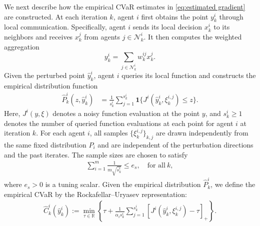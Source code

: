 \documentclass[twocolumn]{autart}    %
\newcommand{\1}{\mathbf{1}}
\begin{document}
We next describe how the empirical CVaR estimates in \eqref{eq:estimated gradient} are constructed. 
At each iteration $k$, agent $i$ first obtains the point $y_k^i$ through local
communication. Specifically, agent $i$ sends its local decision
$x_k^i$ to its neighbors and receives $x_k^j$ from agents
$j\in\mathcal{N}_k^i$. It then computes the weighted aggregation
\begin{equation}\label{eq:update y}
    y_k^i
    =
    \sum_{j\in\mathcal{N}_k^i} w_k^{ij}x_k^j .
\end{equation}
Given the perturbed point $\hat y_k^i$, agent $i$ queries its local function and constructs the empirical distribution function
\begin{align}\label{eq:EDF}
 \hat{P}_k^{i}(z,\hat{y}_k^i)&=\frac{1}{s_k^i} \sum_{j=1}^{s_k^i} \mathbf{1} \{J^i(\hat{y}_k^i, \xi_k^{i,j}) \leq z \}.
\end{align} 
Here, $J^i(y,\xi)$ denotes a noisy function evaluation at
the point $y$, and $s_k^i\geq 1$ denotes the number of queried
function evaluations at each point for agent $i$ at iteration $k$. 
For each agent $i$, all samples $\{\xi_k^{i,j}\}_{k,j}$ are drawn independently from the same fixed distribution $P_i$ 
and are independent of the perturbation directions and the past iterates.
The sample sizes are chosen to satisfy
\begin{align}\label{eq:sampling requirement}
    \sum_{i=1}^{m} \frac{1}{m\sqrt{s_k^i}} \le e_s, \quad \text{for~all}~ k,
\end{align}
where $e_s>0$ is a tuning scalar. 
Given the empirical distribution $\hat P_k^i$, 
we define the empirical
CVaR by the Rockafellar--Uryasev representation:
\begin{align*}
\widehat C_k^i(\hat y_k^i)
:=
\min_{\tau\in\mathbb R}
\left\{
\tau+
\frac{1}{\alpha_i s_k^i}
\sum_{j=1}^{s_k^i}
\left[
J^i(\hat y_k^i,\xi_k^{i,j})-\tau
\right]_+
\right\}.
\end{align*}

 
\end{document}
